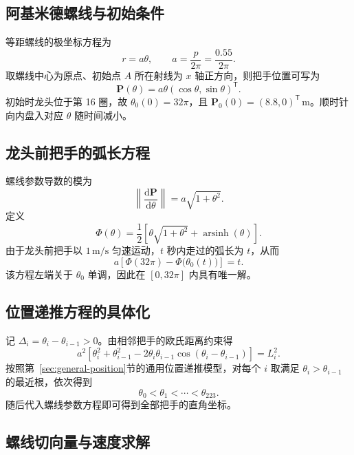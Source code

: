 \documentclass[
  11pt,
  UTF8]{ctexart}
\begin{document}
\hypertarget{ux963fux57faux7c73ux5fb7ux87baux7ebfux53c2ux6570ux5316}{%
\subsection{阿基米德螺线与初始条件}\label{ux963fux57faux7c73ux5fb7ux87baux7ebfux53c2ux6570ux5316}}

等距螺线的极坐标方程为 \[
r=a\theta,\qquad a=\frac{p}{2\pi}=\frac{0.55}{2\pi}.
\] 取螺线中心为原点、初始点 \(A\) 所在射线为 \(x\)
轴正方向，则把手位置可写为 \[
\boldsymbol P(\theta)
=a\theta(\cos\theta,\sin\theta)^{\mathsf T}.
\] 初始时龙头位于第 16 圈，故 \(\theta_0(0)=32\pi\)，且
\(\boldsymbol P_0(0)=(8.8,0)^{\mathsf T}\,\mathrm m\)。顺时针向内盘入对应
\(\theta\) 随时间减小。

\hypertarget{ux9f99ux5934ux524dux628aux624bux7684ux5f27ux957fux65b9ux7a0b}{%
\subsection{龙头前把手的弧长方程}\label{ux9f99ux5934ux524dux628aux624bux7684ux5f27ux957fux65b9ux7a0b}}

螺线参数导数的模为 \[
\left\|\frac{\mathrm d\boldsymbol P}{\mathrm d\theta}\right\|
=a\sqrt{1+\theta^2}.
\] 定义 \[
\Phi(\theta)=\frac12\left[\theta\sqrt{1+\theta^2}
+\operatorname{arsinh}(\theta)\right].
\] 由于龙头前把手以 \(1\,\mathrm{m/s}\) 匀速运动，\(t\) 秒内走过的弧长为
\(t\)，从而 \[
a\left[\Phi(32\pi)-\Phi\bigl(\theta_0(t)\bigr)\right]=t.
\] 该方程左端关于 \(\theta_0\) 单调，因此在 \([0,32\pi]\)
内具有唯一解。

\hypertarget{ux5176ux4f59ux628aux624bux7684ux4f4dux7f6eux9012ux63a8}{%
\subsection{位置递推方程的具体化}\label{ux5176ux4f59ux628aux624bux7684ux4f4dux7f6eux9012ux63a8}}

记 \(\Delta_i=\theta_i-\theta_{i-1}>0\)。由相邻把手的欧氏距离约束得 \[
a^2\!\left[\theta_i^2+\theta_{i-1}^2
-2\theta_i\theta_{i-1}\cos(\theta_i-\theta_{i-1})\right]=L_i^2.
\] 按照第~\ref{sec:general-position}节的通用位置递推模型，对每个 \(i\) 取满足
\(\theta_i>\theta_{i-1}\) 的最近根，依次得到 \[
\theta_0<\theta_1<\cdots<\theta_{223}.
\] 随后代入螺线参数方程即可得到全部把手的直角坐标。

\hypertarget{ux901fux5ea6ux9012ux63a8}{%
\subsection{螺线切向量与速度求解}\label{ux901fux5ea6ux9012ux63a8}}
\end{document}
